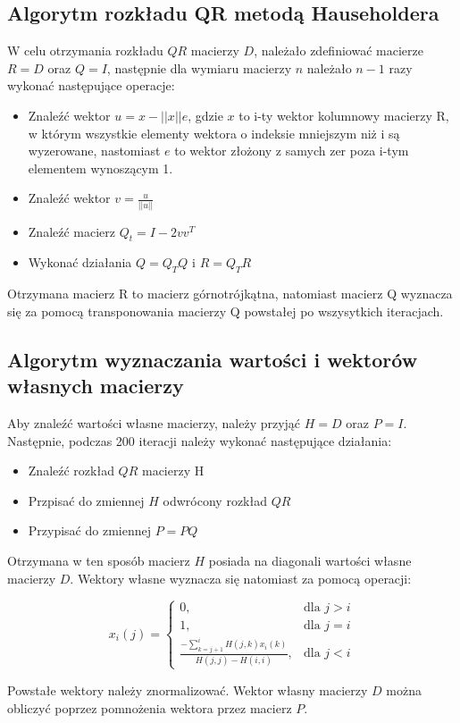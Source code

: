 \documentclass{article}
\begin{document}
 \subsection{Algorytm rozkładu QR metodą Hauseholdera}
W celu otrzymania rozkładu $QR$ macierzy $D$, należało zdefiniować macierze $R = D$ oraz $Q = I$, następnie dla wymiaru macierzy $n$ należało $n-1$ razy wykonać następujące operacje:
\begin{itemize}
    \item Znaleźć wektor $u = x - ||x||e$, gdzie $x$ to i-ty wektor kolumnowy macierzy R, w którym wszystkie elementy wektora o indeksie mniejszym niż i są wyzerowane, nastomiast $e$ to wektor złożony z samych zer poza i-tym elementem wynoszącym 1. 
    \item Znaleźć wektor $v = \frac{u}{||u||}$
    \item Znaleźć macierz $Q_t = I - 2vv^T$
    \item Wykonać działania $Q = Q_TQ$ i $R = Q_TR$
\end{itemize}
Otrzymana macierz R to macierz górnotrójkątna, natomiast macierz Q wyznacza się za pomocą transponowania macierzy Q powstałej po wszysytkich iteracjach.

\subsection{Algorytm wyznaczania wartości i wektorów własnych macierzy}
Aby znaleźć wartości własne macierzy, należy przyjąć $H = D$ oraz $P = I$. Następnie, podczas 200 iteracji należy wykonać następujące działania:
\begin{itemize}
    \item Znaleźć rozkład $QR$ macierzy H
    \item Przpisać do zmiennej $H$ odwrócony rozkład $QR$
    \item Przypisać do zmiennej $P = PQ$
\end{itemize}
Otrzymana w ten sposób macierz $H$ posiada na diagonali wartości własne macierzy $D$. Wektory własne wyznacza się natomiast za pomocą operacji:

\[
x_i(j) = 
\begin{cases} 
0, & \text{dla } j > i \\
1, & \text{dla } j = i \\
\displaystyle \frac{-\sum_{k=j+1}^{i} H(j, k)x_i(k)}{H(j,j) - H(i,i)}, & \text{dla } j < i
\end{cases}
\]


\noindent
Powstałe wektory należy znormalizować. Wektor własny macierzy $D$ można obliczyć poprzez pomnożenia wektora przez macierz $P$.
\end{document}
